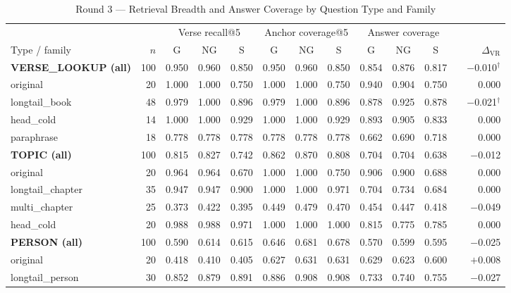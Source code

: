 \begin{table}[!t]
\caption{Round 3 --- Retrieval Breadth and Answer Coverage by Question
Type and Family}
\label{tab:round3family}
\centering
\begin{threeparttable}
\footnotesize
\begin{tabular}{@{}lrccccccccccr@{}}
\toprule
& & \multicolumn{3}{c}{Verse recall@5} & \multicolumn{3}{c}{Anchor
coverage@5} & \multicolumn{3}{c}{Answer coverage} & & \\
\cmidrule(lr){3-5}\cmidrule(lr){6-8}\cmidrule(lr){9-11}
Type / family & $n$ & G & NG & S & G & NG & S & G & NG & S & &
$\Delta_{\mathrm{VR}}$ \\
\midrule
\textbf{VERSE\_LOOKUP (all)} & 100 & 0.950 & 0.960 & 0.850 & 0.950 & 0.960 & 0.850 & 0.854 & 0.876 & 0.817 & & $-$0.010$^\dagger$ \\
\quad original & 20 & 1.000 & 1.000 & 0.750 & 1.000 & 1.000 & 0.750 & 0.940 & 0.904 & 0.750 & & 0.000 \\
\quad longtail\_book & 48 & 0.979 & 1.000 & 0.896 & 0.979 & 1.000 & 0.896 & 0.878 & 0.925 & 0.878 & & $-$0.021$^\dagger$ \\
\quad head\_cold & 14 & 1.000 & 1.000 & 0.929 & 1.000 & 1.000 & 0.929 & 0.893 & 0.905 & 0.833 & & 0.000 \\
\quad paraphrase & 18 & 0.778 & 0.778 & 0.778 & 0.778 & 0.778 & 0.778 & 0.662 & 0.690 & 0.718 & & 0.000 \\
\midrule
\textbf{TOPIC (all)} & 100 & 0.815 & 0.827 & 0.742 & 0.862 & 0.870 & 0.808 & 0.704 & 0.704 & 0.638 & & $-$0.012 \\
\quad original & 20 & 0.964 & 0.964 & 0.670 & 1.000 & 1.000 & 0.750 & 0.906 & 0.900 & 0.688 & & 0.000 \\
\quad longtail\_chapter & 35 & 0.947 & 0.947 & 0.900 & 1.000 & 1.000 & 0.971 & 0.704 & 0.734 & 0.684 & & 0.000 \\
\quad multi\_chapter & 25 & 0.373 & 0.422 & 0.395 & 0.449 & 0.479 & 0.470 & 0.454 & 0.447 & 0.418 & & $-$0.049 \\
\quad head\_cold & 20 & 0.988 & 0.988 & 0.971 & 1.000 & 1.000 & 1.000 & 0.815 & 0.775 & 0.785 & & 0.000 \\
\midrule
\textbf{PERSON (all)} & 100 & 0.590 & 0.614 & 0.615 & 0.646 & 0.681 & 0.678 & 0.570 & 0.599 & 0.595 & & $-$0.025 \\
\quad original & 20 & 0.418 & 0.410 & 0.405 & 0.627 & 0.631 & 0.631 & 0.629 & 0.623 & 0.600 & & $+$0.008 \\
\quad longtail\_person & 30 & 0.852 & 0.879 & 0.891 & 0.886 & 0.908 & 0.908 & 0.733 & 0.740 & 0.755 & & $-$0.027 \\

\end{tabular}
\end{threeparttable}
\end{table}
